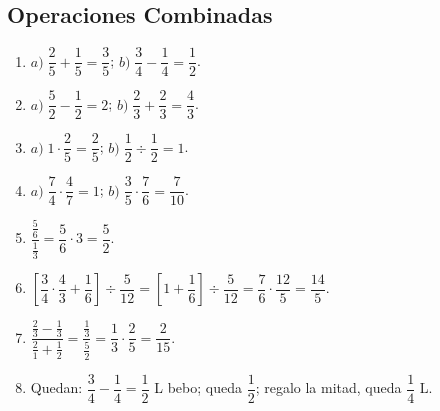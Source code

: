 \documentclass[12pt, letterpaper]{article}
\begin{document}
  \subsection*{Operaciones Combinadas}
  \begin{enumerate}[leftmargin=*, label=\textbf{\arabic*.}]
    \item $a)\; \dfrac{2}{5} + \dfrac{1}{5} = \dfrac{3}{5}$; \quad $b)\; \dfrac{3}{4} - \dfrac{1}{4} = \dfrac{1}{2}$.
    \item $a)\; \dfrac{5}{2} - \dfrac{1}{2} = 2$; \quad $b)\; \dfrac{2}{3} + \dfrac{2}{3} = \dfrac{4}{3}$.
    \item $a)\; 1 \cdot \dfrac{2}{5} = \dfrac{2}{5}$; \quad $b)\; \dfrac{1}{2} \div \dfrac{1}{2} = 1$.
    \item $a)\; \dfrac{7}{4} \cdot \dfrac{4}{7} = 1$; \quad $b)\; \dfrac{3}{5} \cdot \dfrac{7}{6} = \dfrac{7}{10}$.
    \item $\dfrac{\frac{5}{6}}{\frac{1}{3}} = \dfrac{5}{6} \cdot 3 = \dfrac{5}{2}$.
    \item $\left[\dfrac{3}{4} \cdot \dfrac{4}{3} + \dfrac{1}{6}\right] \div \dfrac{5}{12} = \left[1 + \dfrac{1}{6}\right] \div \dfrac{5}{12} = \dfrac{7}{6} \cdot \dfrac{12}{5} = \dfrac{14}{5}$.
    \item $\dfrac{\frac{2}{3} - \frac{1}{3}}{\frac{2}{1} + \frac{1}{2}} = \dfrac{\frac{1}{3}}{\frac{5}{2}} = \dfrac{1}{3} \cdot \dfrac{2}{5} = \dfrac{2}{15}$.
    \item Quedan: $\dfrac{3}{4} - \dfrac{1}{4} = \dfrac{1}{2}$ L bebo; queda $\dfrac{1}{2}$; regalo la mitad, queda $\dfrac{1}{4}$ L.
  \end{enumerate}
\end{document}
